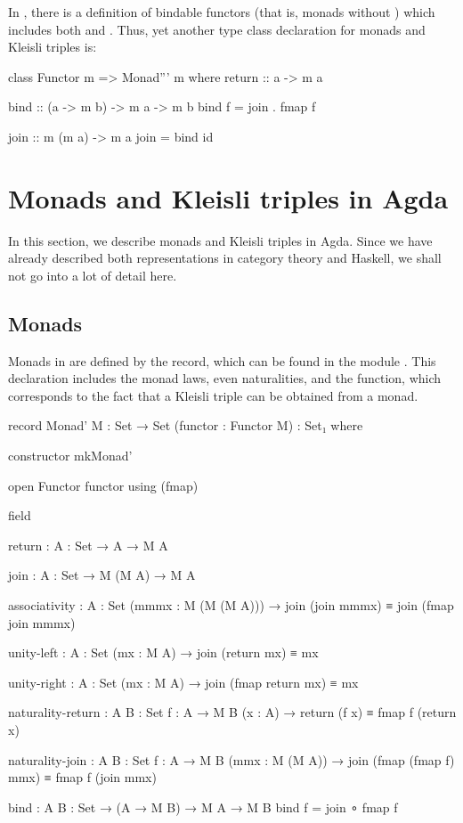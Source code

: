 \begin{remark}

  In \parencite{kmett-2014}, there is a definition of bindable
  functors (that is, monads without ) which
  includes both  and . Thus, yet
  another type class declaration for monads and Kleisli triples is:
  \begin{codehaskell}
class Functor m => Monad''' m where
  return :: a -> m a

  bind :: (a -> m b) -> m a -> m b
  bind f = join . fmap f

  join :: m (m a) -> m a
  join = bind id
  \end{codehaskell}

\end{remark}

\section{Monads and Kleisli triples in Agda}
\label{sec:monads-agda}

In this section, we describe monads and Kleisli triples in Agda. Since
we have already described both representations in category theory and
Haskell, we shall not go into a lot of detail here.

\subsection*{Monads}

Monads in \agda are defined by the  record, which can
be found in the module . This declaration
includes the monad laws, even naturalities, and the 
function, which corresponds to the fact that a Kleisli triple can be
obtained from a monad.
\begin{codeagda}
record Monad' {M : Set → Set} (functor : Functor M) : Set₁ where

  constructor mkMonad'

  open Functor functor using (fmap)

  field

    return : {A : Set} → A → M A

    join   : {A : Set} → M (M A) → M A

    associativity : {A : Set} (mmmx : M (M (M A))) →
                    join (join mmmx) ≡ join (fmap join mmmx)

    unity-left    : {A : Set} (mx : M A) → join (return mx) ≡ mx

    unity-right   : {A : Set} (mx : M A) → join (fmap return mx) ≡ mx

    naturality-return : {A B : Set} {f : A → M B} (x : A) →
                        return (f x) ≡ fmap f (return x)

    naturality-join   : {A B : Set} {f : A → M B} (mmx : M (M A)) →
                        join (fmap (fmap f) mmx) ≡ fmap f (join mmx)

  bind : {A B : Set} → (A → M B) → M A → M B
  bind f = join ∘ fmap f
\end{codeagda}

